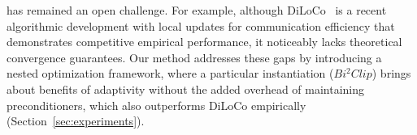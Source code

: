 has remained an open challenge. %
For example, although DiLoCo~\cite{DiLoCoAsynchronous,OpenDiLoCo,DiLoCo} is a recent algorithmic development with local updates for communication efficiency that demonstrates competitive empirical performance, it noticeably lacks theoretical convergence guarantees. 
Our method addresses these gaps by introducing a nested optimization framework, where a particular instantiation ($Bi^2Clip$) brings about benefits of adaptivity without the added overhead of maintaining preconditioners, which also outperforms DiLoCo empirically (Section~\ref{sec:experiments}). %










